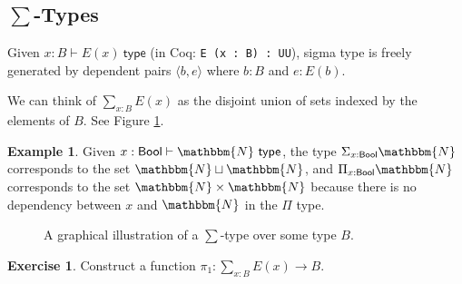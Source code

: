 \documentclass{amsart}
\theoremstyle{definition}
\newtheorem{eg}{Example}[section]
\newtheorem{ex}{Exercise}[section]
\newcommand{\N}{\mathbbm{N}}
\newcommand{\type}{\ensuremath{\mathsf{~type}}}
\newcommand{\defeq}{\ensuremath{\overset{\boldsymbol{\cdot}}{=}}}
\newcommand{\Bool}{\ensuremath{\mathsf{Bool}}}
\newcommand{\Ind}{\ensuremath{\mathsf{ind}}}
\begin{document}
\subsection{$\sum$-Types}
\label{sec:sigma-types}

Given $x : B \vdash E (x) \type$ (in Coq: \texttt{E (x : B) : UU}), sigma type is freely generated by dependent pairs $\langle b, e \rangle$ where $b : B$ and $e : E(b)$.


We can think of $\displaystyle\sum_{x : B}E(x)$ as the disjoint union of sets indexed by the elements of $B$.
See Figure \ref{fig:sigma-type-as-total-space}.

\begin{eg}
    Given $x : \Bool \vdash \N \type$, the type $\Sigma_{x : \Bool} \N$ corresponds to the set $\N \sqcup \N$, and $\Pi_{x : \Bool} \N$ corresponds to the set $\N \times \N$ because there is no dependency between $x$ and $\N$ in the $\Pi$ type.
\end{eg}

\begin{figure}[h]
    \centering
    
    \caption{A graphical illustration of a $\sum$-type over some type $B$.}
    \label{fig:sigma-type-as-total-space}
\end{figure}

\begin{ex}
Construct a function $\pi_1 : \sum_{x : B} E(x) \to B$.
\end{ex}
\end{document}
